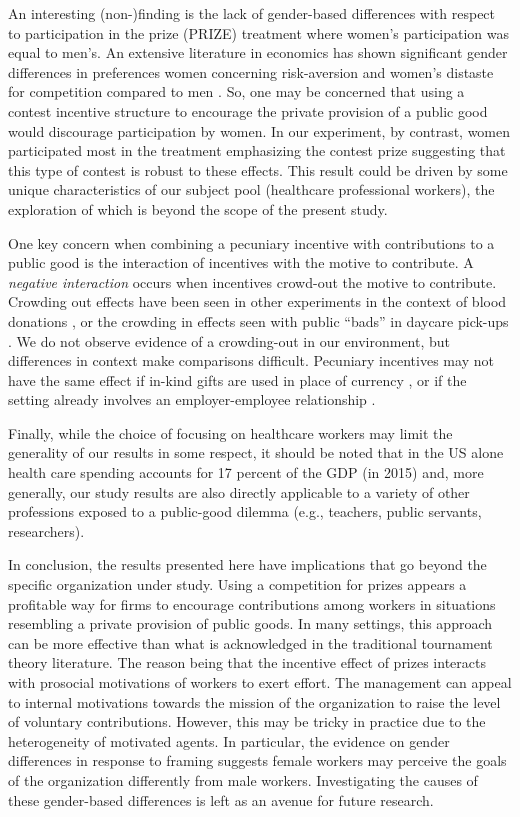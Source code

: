 \documentclass[11pt, titlepage]{article}
\begin{document}
An interesting (non-)finding is the lack of gender-based differences
with respect to participation in the prize (PRIZE) treatment where
women's participation was equal to men's. An extensive literature in
economics has shown significant gender differences in preferences women
concerning risk-aversion \citep{borghans2009gender} and women's distaste
for competition compared to men \citep{niederle2007women}. So, one may
be concerned that using a contest incentive structure to encourage the
private provision of a public good would discourage participation by
women. In our experiment, by contrast, women participated most in the
treatment emphasizing the contest prize suggesting that this type of
contest is robust to these effects. This result could be driven by some
unique characteristics of our subject pool (healthcare professional
workers), the exploration of which is beyond the scope of the present
study.

One key concern when combining a pecuniary incentive with contributions
to a public good is the interaction of incentives with the motive to
contribute. A \emph{negative interaction} occurs when incentives
crowd-out the motive to contribute. Crowding out effects have been seen
in other experiments in the context of blood donations
\citep{lacetera2013economic, lacetera2014rewarding}, or the crowding in
effects seen with public ``bads'' in daycare pick-ups
\citep{gneezy2000fine}. We do not observe evidence of a crowding-out in
our environment, but differences in context make comparisons difficult.
Pecuniary incentives may not have the same effect if in-kind gifts are
used in place of currency \citep[e.g.,][]{kube2012currency}, or if the
setting already involves an employer-employee relationship
\citep[e.g.,][]{fehr1998gift}.

Finally, while the choice of focusing on healthcare workers may limit
the generality of our results in some respect, it should be noted that
in the US alone health care spending accounts for 17 percent of the GDP
(in 2015) and, more generally, our study results are also directly
applicable to a variety of other professions exposed to a public-good
dilemma (e.g., teachers, public servants, researchers).

In conclusion, the results presented here have implications that go
beyond the specific organization under study. Using a competition for
prizes appears a profitable way for firms to encourage contributions
among workers in situations resembling a private provision of public
goods. In many settings, this approach can be more effective than what
is acknowledged in the traditional tournament theory literature. The
reason being that the incentive effect of prizes interacts with
prosocial motivations of workers to exert effort. The management can
appeal to internal motivations towards the mission of the organization
to raise the level of voluntary contributions. However, this may be
tricky in practice due to the heterogeneity of motivated agents. In
particular, the evidence on gender differences in response to framing
suggests female workers may perceive the goals of the organization
differently from male workers. Investigating the causes of these
gender-based differences is left as an avenue for future research.

\renewcommand\refname{References}

\end{document}
